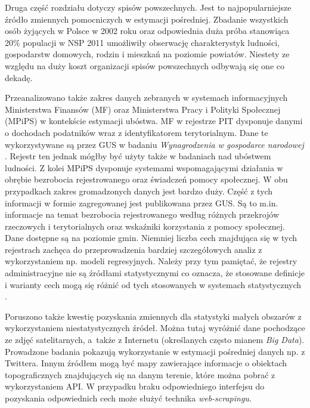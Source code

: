 Druga część rozdziału dotyczy spisów powszechnych. Jest to najpopularniejsze źródło zmiennych pomocniczych w estymacji pośredniej. Zbadanie wszystkich osób żyjących w Polsce w 2002 roku oraz odpowiednia duża próba stanowiąca 20\% populacji w NSP 2011 umożliwiły obserwację charakterystyk ludności, gospodarstw domowych, rodzin i mieszkań na poziomie powiatów. Niestety ze względu na duży koszt organizacji spisów powszechnych odbywają się one co dekadę.

Przeanalizowano także zakres danych zebranych w systemach informacyjnych Ministerstwa Finansów (MF) oraz Ministerstwa Pracy i Polityki Społecznej (MPiPS) w kontekście estymacji ubóstwa. MF w rejestrze PIT dysponuje danymi o dochodach podatników wraz z identyfikatorem terytorialnym. Dane te wykorzystywane są przez GUS w badaniu \textit{Wynagrodzenia w gospodarce narodowej} \citep{pbs2015}. Rejestr ten jednak mógłby być użyty także w badaniach nad ubóstwem ludności. Z kolei MPiPS dysponuje systemami wspomagającymi działania w obrębie bezrobocia rejestrowanego oraz świadczeń pomocy społecznej. W obu przypadkach zakres gromadzonych danych jest bardzo duży. Część z tych informacji w formie zagregowanej jest publikowana przez GUS. Są to m.in. informacje na temat bezrobocia rejestrowanego według różnych przekrojów rzeczowych i terytorialnych oraz wskaźniki korzystania z pomocy społecznej. Dane dostępne są na poziomie gmin. Niemniej liczba cech znajdująca się w tych rejestrach zachęca do przeprowadzenia bardziej szczegółowych analiz z wykorzystaniem np. modeli regresyjnych. Należy przy tym pamiętać, że rejestry administracyjne nie są źródłami statystycznymi co oznacza, że stosowane definicje i warianty cech mogą się różnić od tych stosowanych w systemach statystycznych \citep{roszka2012}.

Poruszono także kwestię pozyskania zmiennych dla statystyki małych obszarów z wykorzystaniem niestatystycznych źródeł. Można tutaj wyróżnić dane pochodzące ze zdjęć satelitarnych, a~także z Internetu (określanych często mianem \textit{Big Data}). Prowadzone badania pokazują wykorzystanie w estymacji pośredniej danych np. z Twittera. Innym źródłem mogą być mapy zawierające informacje o obiektach topograficznych znajdujących się na danym terenie, które można pobrać z wykorzystaniem API. W przypadku braku odpowiedniego interfejsu do pozyskania odpowiednich cech może służyć technika \textit{web-scrapingu}.